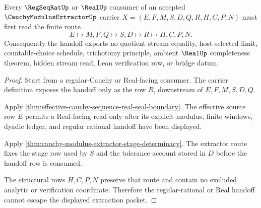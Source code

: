 \begin{theorem}\label{thm:cauchy-modulus-extractor-real-handoff-nonescape}
Every $\RegSeqRatUp$ or $\RealUp$ consumer of an accepted $\CauchyModulusExtractorUp$ carrier $X=(E,F,M,S,D,Q,R,H,C,P,N)$ must first read the finite route
$$
E \longmapsto M,F,Q \longmapsto S,D \longmapsto R \longmapsto H,C,P,N .
$$
Consequently the handoff exports no quotient stream equality, host-selected limit, countable-choice schedule, trichotomy principle, ambient $\RealUp$ completeness theorem, hidden stream read, Lean verification row, or bridge datum.
\end{theorem}
\begin{proof}
Start from a regular-Cauchy or Real-facing consumer. The carrier definition exposes the handoff only as the row $R$, downstream of $E,F,M,S,D,Q$.

Apply \autoref{thm:effective-cauchy-sequence-real-seal-boundary}. The effective source row $E$ permits a Real-facing read only after its explicit modulus, finite windows, dyadic ledger, and regular rational handoff have been displayed.

Apply \autoref{thm:cauchy-modulus-extractor-stage-determinacy}. The extractor route fixes the stage row used by $S$ and the tolerance account stored in $D$ before the handoff row is consumed.

The structural rows $H,C,P,N$ preserve that route and contain no excluded analytic or verification coordinate. Therefore the regular-rational or Real handoff cannot escape the displayed extraction packet.
\end{proof}



